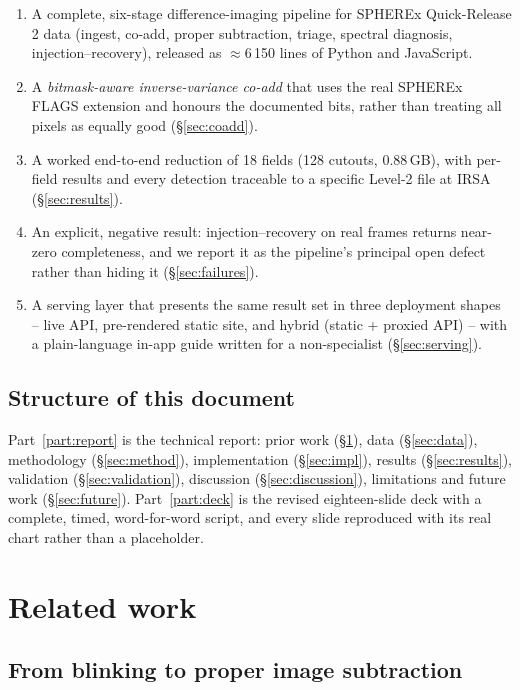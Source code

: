 \documentclass[11pt,a4paper]{article}
\begin{document}
\begin{enumerate}[leftmargin=1.4em,itemsep=2pt]
\item A complete, six-stage difference-imaging pipeline for SPHEREx Quick-Release 2 data
      (ingest, co-add, proper subtraction, triage, spectral diagnosis, injection--recovery),
      released as $\approx$6\,150 lines of Python and JavaScript.
\item A \emph{bitmask-aware inverse-variance co-add} that uses the real SPHEREx FLAGS extension and
      honours the documented bits, rather than treating all pixels as equally good
      (\S\ref{sec:coadd}).
\item A worked end-to-end reduction of 18 fields (128 cutouts, 0.88\,GB), with per-field results and
      every detection traceable to a specific Level-2 file at IRSA (\S\ref{sec:results}).
\item An explicit, negative result: injection--recovery on real frames returns near-zero
      completeness, and we report it as the pipeline's principal open defect rather than hiding it
      (\S\ref{sec:failures}).
\item A serving layer that presents the same result set in three deployment shapes -- live API,
      pre-rendered static site, and hybrid (static + proxied API) -- with a plain-language in-app
      guide written for a non-specialist (\S\ref{sec:serving}).
\end{enumerate}

\subsection{Structure of this document}

Part~\ref{part:report} is the technical report: prior work (\S\ref{sec:prior}), data
(\S\ref{sec:data}), methodology (\S\ref{sec:method}), implementation (\S\ref{sec:impl}), results
(\S\ref{sec:results}), validation (\S\ref{sec:validation}), discussion
(\S\ref{sec:discussion}), limitations and future work (\S\ref{sec:future}). Part~\ref{part:deck}
is the revised eighteen-slide deck with a complete, timed, word-for-word script, and every slide
reproduced with its real chart rather than a placeholder.

\section{Related work}
\label{sec:prior}

\subsection{From blinking to proper image subtraction}
\end{document}
